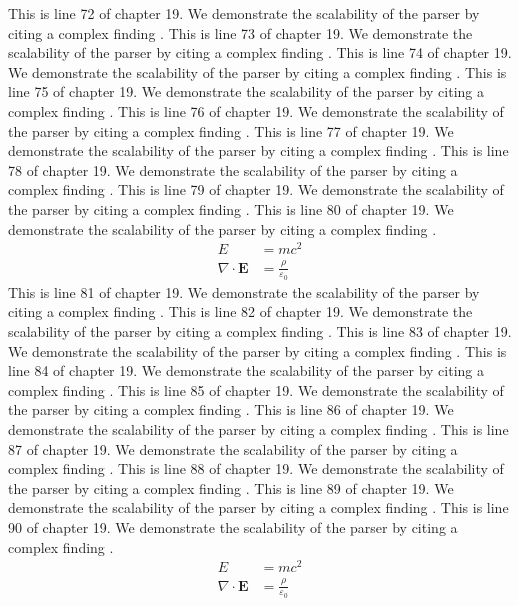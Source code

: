 This is line 72 of chapter 19. We demonstrate the scalability of the parser by citing a complex finding \cite{ref19_72}.
This is line 73 of chapter 19. We demonstrate the scalability of the parser by citing a complex finding \cite{ref19_73}.
This is line 74 of chapter 19. We demonstrate the scalability of the parser by citing a complex finding \cite{ref19_74}.
This is line 75 of chapter 19. We demonstrate the scalability of the parser by citing a complex finding \cite{ref19_75}.
This is line 76 of chapter 19. We demonstrate the scalability of the parser by citing a complex finding \cite{ref19_76}.
This is line 77 of chapter 19. We demonstrate the scalability of the parser by citing a complex finding \cite{ref19_77}.
This is line 78 of chapter 19. We demonstrate the scalability of the parser by citing a complex finding \cite{ref19_78}.
This is line 79 of chapter 19. We demonstrate the scalability of the parser by citing a complex finding \cite{ref19_79}.
This is line 80 of chapter 19. We demonstrate the scalability of the parser by citing a complex finding \cite{ref19_80}.
\begin{align*}
  E &= mc^2 \\
  \nabla \cdot \mathbf{E} &= \frac{\rho}{\varepsilon_0}
\end{align*}
This is line 81 of chapter 19. We demonstrate the scalability of the parser by citing a complex finding \cite{ref19_81}.
This is line 82 of chapter 19. We demonstrate the scalability of the parser by citing a complex finding \cite{ref19_82}.
This is line 83 of chapter 19. We demonstrate the scalability of the parser by citing a complex finding \cite{ref19_83}.
This is line 84 of chapter 19. We demonstrate the scalability of the parser by citing a complex finding \cite{ref19_84}.
This is line 85 of chapter 19. We demonstrate the scalability of the parser by citing a complex finding \cite{ref19_85}.
This is line 86 of chapter 19. We demonstrate the scalability of the parser by citing a complex finding \cite{ref19_86}.
This is line 87 of chapter 19. We demonstrate the scalability of the parser by citing a complex finding \cite{ref19_87}.
This is line 88 of chapter 19. We demonstrate the scalability of the parser by citing a complex finding \cite{ref19_88}.
This is line 89 of chapter 19. We demonstrate the scalability of the parser by citing a complex finding \cite{ref19_89}.
This is line 90 of chapter 19. We demonstrate the scalability of the parser by citing a complex finding \cite{ref19_90}.
\begin{align*}
  E &= mc^2 \\
  \nabla \cdot \mathbf{E} &= \frac{\rho}{\varepsilon_0}
\end{align*}
